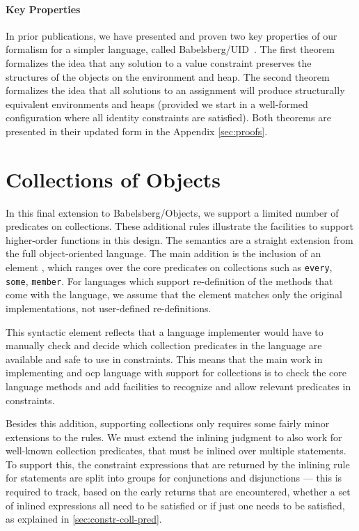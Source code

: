 \paragraph{Key Properties}

In prior publications, we have presented and proven two key properties of our
formalism for a simpler language, called
Babelsberg/UID~\cite{FelgentreffOOPSLA2015,felgentreff:2015:oopsla-companion}. The
first theorem formalizes the idea that any solution to a value constraint
preserves the structures of the objects on the environment and heap. The second
theorem formalizes the idea that all solutions to an assignment will produce
structurally equivalent environments and heaps (provided we start in a
well-formed configuration where all identity constraints are satisfied). Both
theorems are presented in their updated form in the Appendix \ref{sec:proofs}.

\section{Collections of Objects}
\label{sec:records-with-ident}

In this final extension to Babelsberg/Objects, we support a limited number of
predicates on collections. These additional rules illustrate the facilities to
support higher-order functions in this design. The semantics are a straight
extension from the full object-oriented language. The main addition is the
inclusion of an element \ocollpred, which ranges over the core predicates on
collections such as \verb!every!, \verb!some!, \verb!member!. For languages
which support re-definition of the methods that come with the language, we
assume that the element matches only the original implementations, not
user-defined re-definitions.

This syntactic element reflects that a language implementer would have to
manually check and decide which collection predicates in the language are
available and safe to use in constraints. This means that the main work in
implementing and \ac{ocp} language with support for collections is to check the
core language methods and add facilities to recognize and allow relevant
predicates in constraints.

Besides this addition, supporting collections only requires some fairly minor
extensions to the rules. We must extend the inlining judgment to also work for
well-known collection predicates, that must be inlined over multiple
statements. To support this, the constraint expressions that are returned by the
inlining rule for statements are split into groups for conjunctions and
disjunctions --- this is required to track, based on the early returns that are
encountered, whether a set of inlined expressions all need to be satisfied or if
just one needs to be satisfied, as explained in \autoref{sec:constr-coll-pred}.

